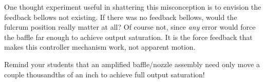 One thought experiment useful in shattering this misconception is to envision the feedback bellows not existing.  If there was no feedback bellows, would the fulcrum position really matter at all?  Of course not, since {\it any} error would force the baffle far enough to achieve output saturation.  It is the force feedback that makes this controller mechanism work, not apparent motion.

Remind your students that an amplified baffle/nozzle assembly need only move a couple thousandths of an inch to achieve full output saturation!




